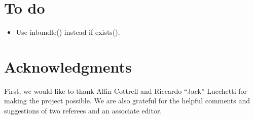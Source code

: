 \documentclass[article]{repec}
\begin{document}
\section*{To do}
	\begin{itemize}
		\item Use inbundle() instead if exists().
	\end{itemize}\newpage

\tableofcontents\newpage









\section*{Acknowledgments}
First, we would like to thank Allin Cottrell and Riccardo ``Jack''
Lucchetti for making the  project possible. We are also grateful
for the helpful comments and suggestions of two referees and an
associate editor.


\appendix

\end{document}
